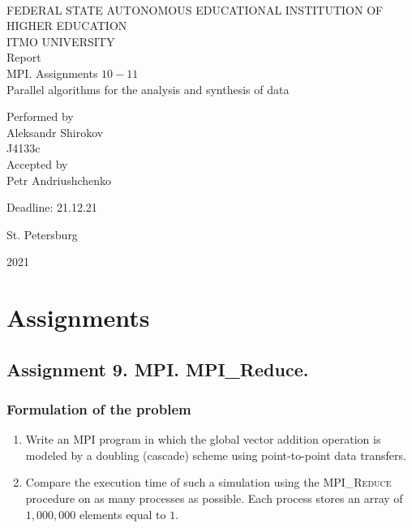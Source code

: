 \documentclass[%
12pt, %
final, %
oneside, %
onecolumn, %
centertags]{article} %
\theoremstyle{plain}
\theoremstyle{definition}
\theoremstyle{remark}
\begin{document}
	\begin{titlepage} 
		\begin{center}
		\textbf{}\\[2.0cm]
		\LARGE FEDERAL STATE AUTONOMOUS EDUCATIONAL INSTITUTION OF HIGHER EDUCATION \\[0.5cm]
		\Large ITMO UNIVERSITY \\[3cm]
		\LARGE Report\\
		\Large MPI. Assignments $10-11$ \\
		\Large Parallel algorithms for the analysis and synthesis of data \\[4cm]


		\begin{flushright}
		Performed by\\
		Aleksandr Shirokov\\
		J4133c\\
		Accepted by\\
		Petr Andriushchenko

		Deadline: 21.12.21
		\end{flushright}

		\vfill 

		{\Large {St. Petersburg}} \par
		{\Large {2021}}
		\end{center} 
	\end{titlepage}

\tableofcontents
\newpage


\section{Assignments}

\subsection{Assignment 9. MPI. MPI\_Reduce.}

\subsubsection{Formulation of the problem}

\begin{enumerate}
	\item Write an MPI program in which the global vector addition operation is modeled by a 
doubling (cascade) scheme using point-to-point data transfers.
	\item Compare the execution time of such a simulation using the \textsc{MPI\_Reduce} procedure on as many processes as possible. Each process stores an array of $1,000,000$ elements equal to $1$.
\end{enumerate}
\end{document}
